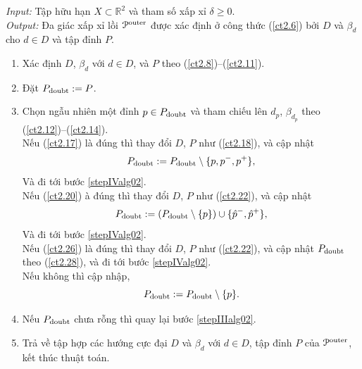 \documentclass[12pt,a4paper,openany,oneside]{report}
\def\R{\mathbb{R}}
\begin{document}
\begin{algorithm}\label{alg02}  \rm 
	\caption{}  \label{al-blduoi1}
	\emph{Input:}  Tập hữu hạn $X \subset \R^2$ và tham số xấp xỉ $\delta \geq 0$. \\
	\emph{Output:} Đa giác xấp xỉ lồi  ${\cal P}^{\rm outer}$  được xác định ở công thức (\ref{ct2.6}) bởi $D$ và $\beta_d$ cho $d \in D$ và tập đỉnh $P$.
	\begin{enumerate}
		\item\label{stepIalg02} 
		Xác định $D$, $\beta_d$ với $d \in D$, và $P$ theo (\ref{ct2.8})--(\ref{ct2.11}).
		
		\item\label{stepIIalg02} Đặt $P_{\rm doubt} := P$.
		
		\item\label{stepIIIalg02} 
		Chọn ngẫu nhiên một đỉnh $p \in P_{\rm doubt}$ và tham chiếu lên $d_p$, $\beta_{d_p}$ theo (\ref{ct2.12})--(\ref{ct2.14}). \\
		Nếu (\ref{ct2.17}) là đúng thì thay đổi $D$, $P$ như (\ref{ct2.18}), và cập nhật
		\begin{equation}\label{ct2.27}
			P_{\rm doubt} := P_{\rm doubt} \setminus \{p, p^-, p^+\},
		\end{equation}
		Và đi tới bước \ref{stepIValg02}.\\
		Nếu (\ref{ct2.20}) à đúng thì thay đổi $D$, $P$ như (\ref{ct2.22}), và cập nhật
		\begin{equation}\label{ct2.28}
			P_{\rm doubt} := (P_{\rm doubt} \setminus \{p\}) \cup \{\hat p^-, \hat p^+\},
		\end{equation}
		Và đi tới bước \ref{stepIValg02}.\\
		Nếu (\ref{ct2.26}) là đúng thì thay đổi $D$, $P$ như (\ref{ct2.22}), và cập nhật $P_{\rm doubt}$ theo (\ref{ct2.28}), và đi tới bước \ref{stepIValg02}.\\
		Nếu không thì cập nhập, 
		\begin{equation}\label{ct2.29}
			P_{\rm doubt} := P_{\rm doubt} \setminus \{p\}.
		\end{equation}
		
		\item\label{stepIValg02} 
		Nếu $P_{\rm doubt}$ chưa rỗng thì quay lại bước \ref{stepIIIalg02}.
		
		\item
		Trả về tập hợp các hướng cực đại $D$ và $\beta_d$ với $d \in D$, tập đỉnh $P$ của ${\cal P}^{\rm outer}$, kết thúc thuật toán.
	\end{enumerate}
\end{algorithm}
\end{document}
